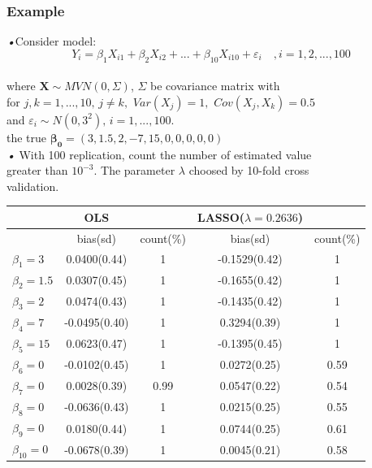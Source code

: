 \documentclass{beamer}
\begin{document}
\begin{frame}
\frametitle{Example}
\emph{•}Consider model: 
\begin{equation*}
Y_i =  \beta_1 X_{i1} +\beta_2 X_{i2} +...+\beta_{10} X_{i10}  + \varepsilon_i \quad , i=1,2,...,100
\end{equation*} 
\\\quad where $\mathbf{X} \sim MVN(0 ,\Sigma)$, $\Sigma$ be covariance matrix with 
\\\quad for $j , k = 1,...,10,\, j \neq k,$ $Var(X_j) = 1,$ $Cov(X_j,X_k) = 0.5 $ 
\\\quad and $\varepsilon_i \sim N(0,3^2), \,i=1,...,100$.
\\\quad the true $\boldsymbol{\beta_0}=(3 , 1.5 , 2 , -7 , 15 ,0 ,0 , 0 , 0 ,0)$    
\\\emph{•} With 100 replication, count the number of estimated value 
\\\quad greater than $10^{-3}$. The parameter $\lambda$ choosed by 10-fold cross
\\\quad validation.  

\end{frame}

\begin{frame}
\fontsize{9pt}{13pt}
\begin{tabular}[t]{|l|c|c|c|c|}
	\hline
	            & OLS       &       & LASSO($\lambda = 0.2636$)      & \\  
	\hline
                & bias(sd)    & count(\%) & bias(sd)     & count(\%) \\
	\hline  
	$\beta_1=3$ & 0.0400(0.44)&    1  & -0.1529(0.42)  & 1\\
	$\beta_2=1.5$ &0.0307(0.45) & 1     &-0.1655(0.42)   & 1\\
	$\beta_3=2$ & 0.0474(0.43) & 1     &-0.1435(0.42)   &1\\
	$\beta_4=7$ &-0.0495(0.40) & 1     &0.3294(0.39)  &1\\
	$\beta_5=15$&0.0623(0.47) & 1      &-0.1395(0.45)  &1\\
	$\beta_6=0$&-0.0102(0.45) & 1     &0.0272(0.25)  &0.59\\ 
	$\beta_7=0$&0.0028(0.39) & 0.99 	  &0.0547(0.22)  &0.54\\     	                  
	$\beta_8=0$&-0.0636(0.43) & 1 	  &0.0215(0.25)  &0.55\\
	$\beta_9=0$&0.0180(0.44) & 1 	  &0.0744(0.25)  &0.61\\
	$\beta_{10}=0$&-0.0678(0.39) & 1 	  &0.0045(0.21)  &0.58\\
	
	\hline
\end{tabular}
\end{frame}     
\end{document}
